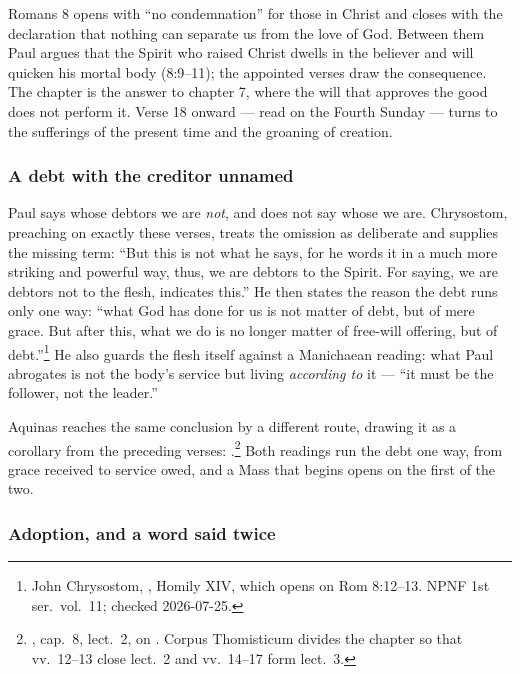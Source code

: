 Romans 8 opens with ``no condemnation'' for those in Christ and closes with the
declaration that nothing can separate us from the love of God. Between them
Paul argues that the Spirit who raised Christ dwells in the believer and will
quicken his mortal body (8:9--11); the appointed verses draw the consequence.
The chapter is the answer to chapter 7, where the will that approves the good
does not perform it. Verse 18 onward --- read on the Fourth Sunday --- turns to
the sufferings of the present time and the groaning of creation.

\subsubsection*{A debt with the creditor unnamed}

 Paul says whose debtors we are \emph{not},
and does not say whose we are. Chrysostom, preaching on exactly these verses,
treats the omission as deliberate and supplies the missing term: ``But this is
not what he says, for he words it in a much more striking and powerful way,
thus, we are debtors to the Spirit. For saying, we are debtors not to the
flesh, indicates this.'' He then states the reason the debt runs only one way:
``what God has done for us is not matter of debt, but of mere grace. But after
this, what we do is no longer matter of free-will offering, but of
debt.''\footnote{John Chrysostom, , Homily XIV, which opens on Rom 8:12--13. NPNF 1st ser.\ vol.\ 11;
checked 2026-07-25.} He also guards the flesh itself against a Manichaean
reading: what Paul abrogates is not the body's service but living
\emph{according to} it --- ``it must be the follower, not the leader.''

Aquinas reaches the same conclusion by a different route, drawing it as a
corollary from the preceding verses: .\footnote{, cap.\ 8, lect.\ 2, on
. Corpus Thomisticum divides the chapter so that vv.\
12--13 close lect.\ 2 and vv.\ 14--17 form lect.\ 3.} Both readings run the
debt one way, from grace received to service owed, and a Mass that begins
\latin{suscépimus} opens on the first of the two.

\subsubsection*{Adoption, and a word said twice}

